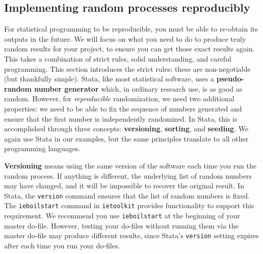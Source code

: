 

\subsection{Implementing random processes reproducibly}

For statistical programming to be reproducible,
you must be able to re-obtain its outputs in the future.\cite{orozco2018make}
We will focus on what you need to do to produce
truly random results for your project,
to ensure you can get those exact results again.
This takes a combination of strict rules, solid understanding, and careful programming.
This section introduces the strict rules:
these are non-negotiable (but thankfully simple).
Stata, like most statistical software, uses a \textbf{pseudo-random number generator}
which, in ordinary research use, is as good as random.
However, for \textit{reproducible} randomization, we need two additional properties:
we need to be able to fix the sequence of numbers generated and
ensure that the first number is independently randomized.
In Stata, this is accomplished through three concepts:
\textbf{versioning}, \textbf{sorting}, and \textbf{seeding}.
We again use Stata in our examples,
but the same principles translate to all other programming languages.

\textbf{Versioning} means using the same version of the software each time you run the random process.
If anything is different, the underlying list of random numbers may have changed,
and it will be impossible to recover the original result.
In Stata, the \texttt{version} command ensures that the list of random numbers is fixed.
The \texttt{ieboilstart} command in \texttt{ietoolkit} provides functionality to support this requirement.
We recommend you use \texttt{ieboilstart} at the beginning of your master do-file.
However, testing your do-files without running them
via the master do-file may produce different results,
since Stata's \texttt{version} setting expires after each time you run your do-files.

